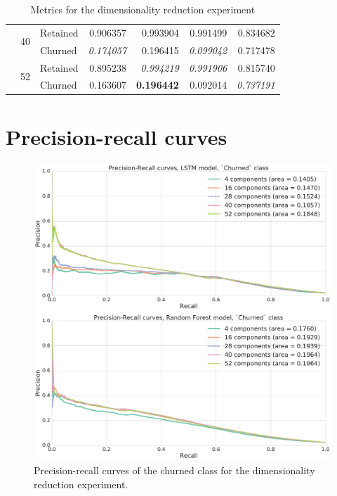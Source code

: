 \documentclass{kththesis}
\begin{document}
\begin{table}
\begin{tabular}{lllrrrr}
\cline{2-7}
     & \multirow{2}{*}{40} & Retained &  0.906357 &  0.993904 &   0.991499 &  0.834682 \\
     &   & Churned &  \textit{0.174057} &  0.196415 &   \textit{0.099042} &  0.717478 \\
\cline{2-7}
     & \multirow{2}{*}{52} & Retained &  0.895238 &  \textit{0.994219} &   \textit{0.991906} &  0.815740 \\
     &   & Churned &  0.163607 &  \textbf{0.196442} &   0.092014 &  \textit{0.737191} \\
\bottomrule
\end{tabular}
\caption{Metrics for the dimensionality reduction experiment}
\label{tab:dim_reduction}
\end{table}

\section{Precision-recall curves}

\begin{figure}[h]
    \centering
    \includegraphics[width=1.0\textwidth,keepaspectratio]{figures/prc_dim_reduction.pdf}
    \caption{Precision-recall curves of the churned class for the dimensionality reduction experiment.}
    \label{fig:prc_dim_reduction}
\end{figure}
\end{document}
